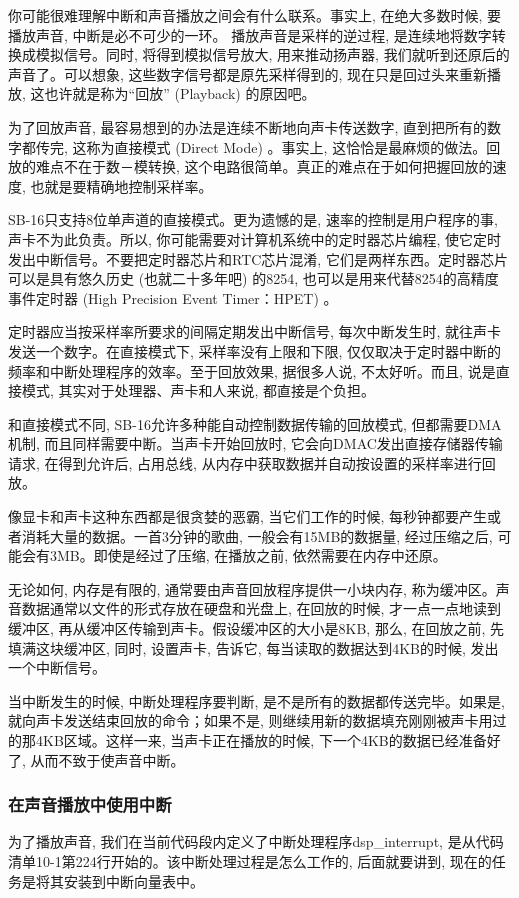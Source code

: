 \documentclass[12pt]{article}
\begin{document}
\begin{CJK}{UTF8}{gbsn}
你可能很难理解中断和声音播放之间会有什么联系。事实上, 在绝大多数时候, 要播放声音, 中断是必不可少的一环。
播放声音是采样的逆过程, 是连续地将数字转换成模拟信号。同时, 将得到模拟信号放大, 用来推动扬声器, 我们就听到还原后的声音了。可以想象, 这些数字信号都是原先采样得到的, 现在只是回过头来重新播放, 这也许就是称为“回放” (Playback) 的原因吧。

为了回放声音, 最容易想到的办法是连续不断地向声卡传送数字, 直到把所有的数字都传完, 这称为直接模式 (Direct Mode) 。事实上, 这恰恰是最麻烦的做法。回放的难点不在于数－模转换, 这个电路很简单。真正的难点在于如何把握回放的速度, 也就是要精确地控制采样率。

SB-16只支持8位单声道的直接模式。更为遗憾的是, 速率的控制是用户程序的事, 声卡不为此负责。所以, 你可能需要对计算机系统中的定时器芯片编程, 使它定时发出中断信号。不要把定时器芯片和RTC芯片混淆, 它们是两样东西。定时器芯片可以是具有悠久历史 (也就二十多年吧) 的8254, 也可以是用来代替8254的高精度事件定时器 (High Precision Event Timer：HPET) 。

定时器应当按采样率所要求的间隔定期发出中断信号, 每次中断发生时, 就往声卡发送一个数字。在直接模式下, 采样率没有上限和下限, 仅仅取决于定时器中断的频率和中断处理程序的效率。至于回放效果, 据很多人说, 不太好听。而且, 说是直接模式, 其实对于处理器、声卡和人来说, 都直接是个负担。

和直接模式不同, SB-16允许多种能自动控制数据传输的回放模式, 但都需要DMA机制, 而且同样需要中断。当声卡开始回放时, 它会向DMAC发出直接存储器传输请求, 在得到允许后, 占用总线, 从内存中获取数据并自动按设置的采样率进行回放。

像显卡和声卡这种东西都是很贪婪的恶霸, 当它们工作的时候, 每秒钟都要产生或者消耗大量的数据。一首3分钟的歌曲, 一般会有15MB的数据量, 经过压缩之后, 可能会有3MB。即使是经过了压缩, 在播放之前, 依然需要在内存中还原。

无论如何, 内存是有限的, 通常要由声音回放程序提供一小块内存, 称为缓冲区。声音数据通常以文件的形式存放在硬盘和光盘上, 在回放的时候, 才一点一点地读到缓冲区, 再从缓冲区传输到声卡。假设缓冲区的大小是8KB, 那么, 在回放之前, 先填满这块缓冲区, 同时, 设置声卡, 告诉它, 每当读取的数据达到4KB的时候, 发出一个中断信号。

当中断发生的时候, 中断处理程序要判断, 是不是所有的数据都传送完毕。如果是, 就向声卡发送结束回放的命令；如果不是, 则继续用新的数据填充刚刚被声卡用过的那4KB区域。这样一来, 当声卡正在播放的时候, 下一个4KB的数据已经准备好了, 从而不致于使声音中断。

\subsubsection{在声音播放中使用中断}
为了播放声音, 我们在当前代码段内定义了中断处理程序dsp\_{}interrupt, 是从代码清单10-1第224行开始的。该中断处理过程是怎么工作的, 后面就要讲到, 现在的任务是将其安装到中断向量表中。


\end{CJK}
\end{document}
